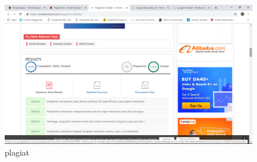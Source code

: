 \begin{figure}[!htbp]
\centering
\includegraphics[scale=0.2]{figures/6/1174012/SSP.PNG}
\caption{plagiat}
\label{plagiat}
\end{figure}
